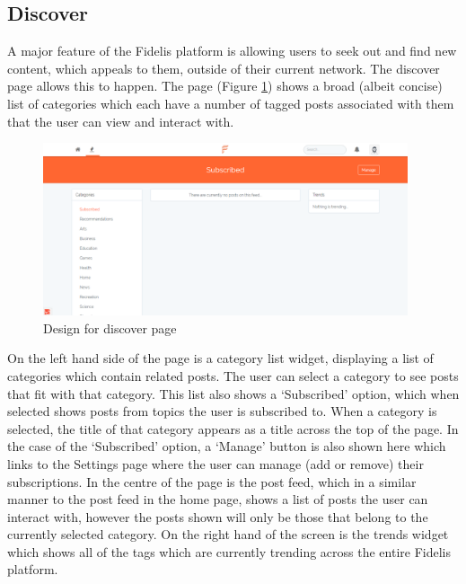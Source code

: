 \subsection{Discover}
A major feature of the Fidelis platform is allowing users to seek out and find new content, which appeals to them, outside of their current network. The discover page allows this to happen. The page (Figure \ref{fig:discover_page}) shows a broad (albeit concise) list of categories which each have a number of tagged posts associated with them that the user can view and interact with.

\begin{figure}[H]
\centering
\includegraphics[height=2in]{Images/Design/discover}
\caption{Design for discover page}
\label{fig:discover_page}
\end{figure}

On the left hand side of the page is a category list widget, displaying a list of categories which contain related posts. The user can select a category to see posts that fit with that category. This list also shows a `Subscribed' option, which when selected shows posts from topics the user is subscribed to. When a category is selected, the title of that category appears as a title across the top of the page. In the case of the `Subscribed' option, a `Manage' button is also shown here which links to the Settings page where the user can manage (add or remove) their subscriptions. In the centre of the page is the post feed, which in a similar manner to the post feed in the home page, shows a list of posts the user can interact with, however the posts shown will only be those that belong to the currently selected category. On the right hand of the screen is the trends widget which shows all of the tags which are currently trending across the entire Fidelis platform.


